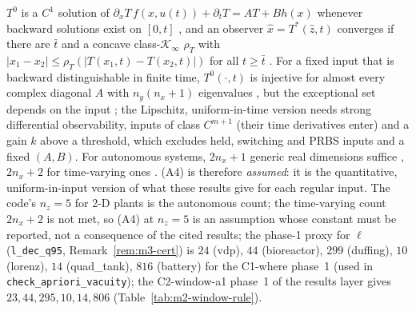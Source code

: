 \begin{remark}\label{rem:m1-exist}
$T^0$ is a $C^1$ solution of $\partial_xT\,f(x,u(t))+\partial_tT=AT+Bh(x)$ whenever backward solutions
exist on $[0,t]$ \citep[Lemma~1]{bernard2019luenberger}, and an observer
$\hat x=T^*(\hat z,t)$ converges if there are $\bar t$ and a concave class-$\mathcal K_\infty$ $\rho_T$ with
$|x_1-x_2|\le\rho_T(|T(x_1,t)-T(x_2,t)|)$ for all $t\ge\bar t$ \citep[Theorem~1]{bernard2019luenberger}.
For a fixed input that is backward distinguishable in finite time, $T^0(\cdot,t)$ is injective for almost
every complex diagonal $A$ with $n_y(n_x+1)$ eigenvalues \citep[Theorem~3]{bernard2019luenberger}, but the
exceptional set depends on the input \citep[Remark~5]{bernard2019luenberger}; the Lipschitz, uniform-in-time
version \citep[Theorem~2]{bernard2019luenberger} needs strong differential observability, inputs of class
$C^{m+1}$ (their time derivatives enter) and a gain $k$ above a threshold, which excludes held, switching
and PRBS inputs and a fixed $(A,B)$. For autonomous systems, $2n_x+1$ generic real dimensions suffice
\citep[Theorem~3.4]{brivadis2023further}, $2n_x+2$ for time-varying ones \citep[Remark~3.6]{brivadis2023further}.
(A4) is therefore \emph{assumed}: it is the quantitative, uniform-in-input version of what these results give
for each regular input. The code's $n_z=5$ for 2-D plants is the autonomous count; the time-varying count
$2n_x+2$ is not met, so (A4) at $n_z=5$ is an assumption whose constant must be reported, not a consequence of the cited
results; the phase-1 proxy for $\ell$ (\texttt{l\_dec\_q95}, Remark~\ref{rem:m3-cert}) is $24$ (vdp), $44$
(bioreactor), $299$ (duffing), $10$ (lorenz), $14$ (quad\_tank), $816$ (battery) for the C1-where phase~1 (used in
\texttt{check\_apriori\_vacuity}); the C2-window-a1 phase~1 of the results layer gives $23,44,295,10,14,806$
(Table~\ref{tab:m2-window-rule}).
\end{remark}

